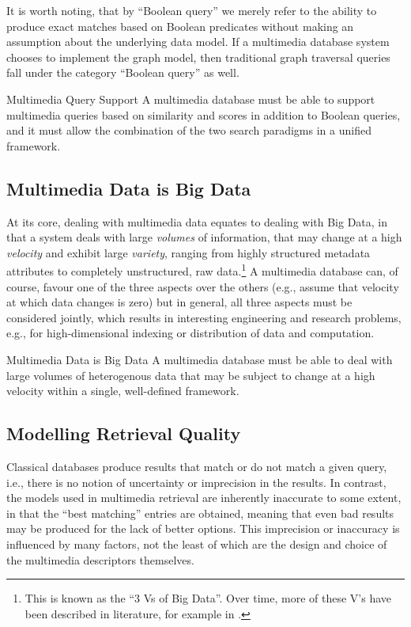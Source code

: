It is worth noting, that by ``Boolean query'' we merely refer to the ability to produce exact matches based on Boolean predicates without making an assumption about the underlying data model. If a multimedia database system chooses to implement the graph model, then traditional graph traversal queries fall under the category ``Boolean query'' as well.

\begin{requirement}[label=requirement:multimedia_search]{Multimedia Query Support}{}
    A multimedia database must be able to support multimedia queries based on similarity and scores in addition to Boolean queries, and it must allow the combination of the two search paradigms in a unified framework.
\end{requirement}

\subsection{Multimedia Data is Big Data}
At its core, dealing with multimedia data equates to dealing with Big Data, in that a system deals with large \emph{volumes} of information, that may change at a high \emph{velocity} and exhibit large \emph{variety}, ranging from highly structured metadata attributes to completely unstructured, raw data.\footnote{This is known as the ``3 Vs of Big Data''. Over time, more of these V's have been described in literature, for example in \cite{Khan:2014Seven}.} A multimedia database can, of course, favour one of the three aspects over the others (e.g., assume that velocity at which data changes is zero) but in general, all three aspects must be considered jointly, which results in interesting engineering and research problems, e.g., for high-dimensional indexing \cite{Hojsgaard:2019Index} or distribution of data and computation.

\begin{requirement}[label=requirement:big_data]{Multimedia Data is Big Data}{}
    A multimedia database must be able to deal with large volumes of heterogenous data that may be subject to change at a high velocity within a single, well-defined framework.
\end{requirement}

\subsection{Modelling Retrieval Quality}

Classical databases produce results that match or do not match a given query, i.e., there is no notion of uncertainty or imprecision in the results. In contrast, the models used in multimedia retrieval are inherently inaccurate to some extent, in that the ``best matching'' entries are obtained, meaning that even bad results may be produced for the lack of better options. This imprecision or inaccuracy is influenced by many factors, not the least of which are the design and choice of the multimedia descriptors themselves.

